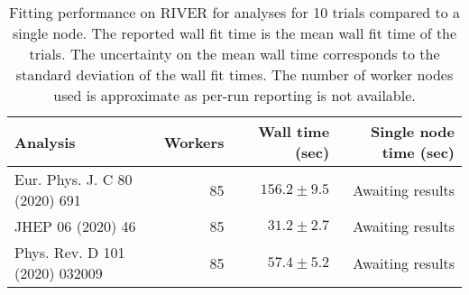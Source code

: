 \begin{table}[htpb]
\centering
\caption{Fitting performance on RIVER for analyses for 10 trials compared to a single node. The reported wall fit time is the mean wall fit time of the trials. The uncertainty on the mean wall time corresponds to the standard deviation of the wall fit times. The number of worker nodes used is approximate as per-run reporting is not available.}
\label{table:performance}
\begin{tabular}{@{}lrrr@{}}
\toprule
                      Analysis & Workers & Wall time (sec) & Single node time (sec) \\
\midrule
 Eur. Phys. J. C 80 (2020) 691 &      85 &   $156.2\pm9.5$ &       Awaiting results \\
             JHEP 06 (2020) 46 &      85 &    $31.2\pm2.7$ &       Awaiting results \\
Phys. Rev. D 101 (2020) 032009 &      85 &    $57.4\pm5.2$ &       Awaiting results \\
\bottomrule
\end{tabular}
\end{table}
